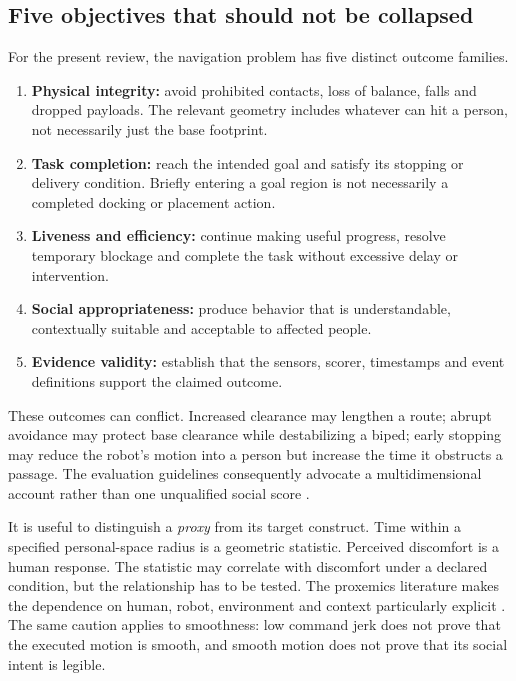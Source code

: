 \subsection{Five objectives that should not be collapsed}
For the present review, the navigation problem has five distinct outcome families.
\begin{enumerate}
\item \textbf{Physical integrity:} avoid prohibited contacts, loss of balance,
falls and dropped payloads. The relevant geometry includes whatever can hit a
person, not necessarily just the base footprint.
\item \textbf{Task completion:} reach the intended goal and satisfy its stopping
or delivery condition. Briefly entering a goal region is not necessarily a
completed docking or placement action.
\item \textbf{Liveness and efficiency:} continue making useful progress, resolve
temporary blockage and complete the task without excessive delay or intervention.
\item \textbf{Social appropriateness:} produce behavior that is understandable,
contextually suitable and acceptable to affected people.
\item \textbf{Evidence validity:} establish that the sensors, scorer, timestamps
and event definitions support the claimed outcome.
\end{enumerate}
These outcomes can conflict. Increased clearance may lengthen a route; abrupt
avoidance may protect base clearance while destabilizing a biped; early stopping
may reduce the robot's motion into a person but increase the time it obstructs a
passage. The evaluation guidelines consequently advocate a multidimensional
account rather than one unqualified social score \citep{guidelines}.

It is useful to distinguish a \emph{proxy} from its target construct. Time within
a specified personal-space radius is a geometric statistic. Perceived discomfort
is a human response. The statistic may correlate with discomfort under a declared
condition, but the relationship has to be tested. The proxemics literature makes
the dependence on human, robot, environment and context particularly explicit
\citep{proxemics2026}. The same caution applies to smoothness: low command jerk
does not prove that the executed motion is smooth, and smooth motion does not
prove that its social intent is legible.

